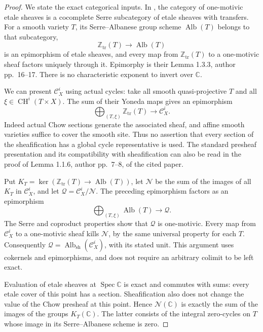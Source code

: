 \begin{proof}
We state the exact categorical inputs. In
\citet[Corollary 1.3.5, Proposition 1.3.11, and
Lemma 1.3.12, author pp.~18, 24--25]{cyAyoubBarbieriViale2009},
the category of one-motivic etale sheaves is a cocomplete
Serre subcategory of etale sheaves with transfers. For a
smooth variety $T$, its Serre--Albanese group scheme
$\operatorname{Alb}(T)$ belongs to that subcategory,
\[
 \mathbb Z_{\mathrm{tr}}(T)\longrightarrow
                           \operatorname{Alb}(T)
\]
is an epimorphism of etale sheaves, and every map from
$\mathbb Z_{\mathrm{tr}}(T)$ to a one-motivic sheaf factors
uniquely through it. Epimorphy is their Lemma 1.3.3,
author pp.~16--17. There is no characteristic exponent to
invert over $\mathbb C$.

We can present $\mathcal C_X^i$ using actual cycles: take
all smooth quasi-projective $T$ and all
$\xi\in\operatorname{CH}^i(T\times X)$. The sum of their
Yoneda maps gives an epimorphism
\[
 \bigoplus_{(T,\xi)}\mathbb Z_{\mathrm{tr}}(T)
                       \longrightarrow\mathcal C_X^i.
\]
Indeed actual Chow sections generate the associated sheaf,
and affine smooth varieties suffice to cover the smooth site.
Thus no assertion that every section of the sheafification
has a global cycle representative is used. The standard
presheaf presentation and its compatibility with
sheafification can also be read in the proof of
Lemma 1.1.6, author pp.~7--8, of the cited paper.

Put $K_T=\ker(\mathbb Z_{\mathrm{tr}}(T)\to
\operatorname{Alb}(T))$, let $\mathcal N$ be the sum of
the images of all $K_T$ in $\mathcal C_X^i$, and let
$\mathcal Q=\mathcal C_X^i/\mathcal N$. The preceding
epimorphism factors as an epimorphism
\[
            \bigoplus_{(T,\xi)}\operatorname{Alb}(T)
                              \longrightarrow\mathcal Q.
\]
The Serre and coproduct properties show that $\mathcal Q$
is one-motivic. Every map from $\mathcal C_X^i$ to a
one-motivic sheaf kills $\mathcal N$, by the same universal
property for each $T$. Consequently
$\mathcal Q=\operatorname{Alb}_{\mathrm{sh}}(\mathcal C_X^i)$,
with its stated unit. This argument uses cokernels and
epimorphisms, and does not require an arbitrary colimit to
be left exact.

Evaluation of etale sheaves at $\operatorname{Spec}\mathbb C$
is exact and commutes with sums: every etale cover of this
point has a section. Sheafification also does not change
the value of the Chow presheaf at this point. Hence
$\mathcal N(\mathbb C)$ is exactly the sum of the images
of the groups $K_T(\mathbb C)$. The latter consists of the
integral zero-cycles on $T$ whose image in its
Serre--Albanese scheme is zero.


\end{proof}
